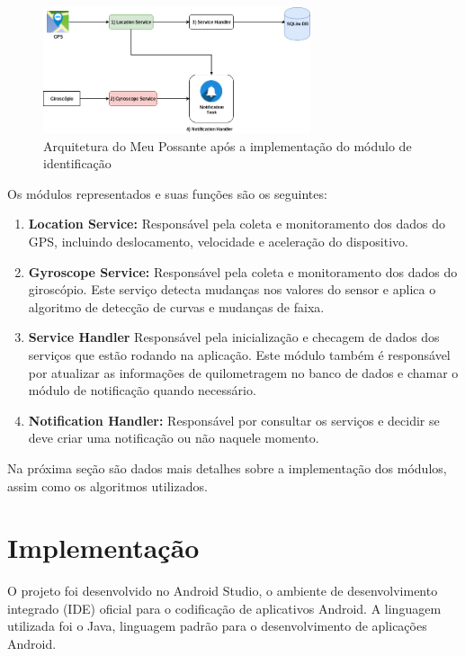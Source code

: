 \begin{figure}[h]
\centering
\includegraphics[width=0.7\textwidth]{images/arquitetura-meu-possante-com-modulo.png}
\caption{Arquitetura do Meu Possante após a implementação do módulo de identificação}
\label{arquitetura-meu-possante-com-modulo}
\end{figure}

Os módulos representados e suas funções são os seguintes:

\begin{enumerate}
  \item \textbf{Location Service:} Responsável pela coleta e monitoramento dos dados do GPS, incluindo deslocamento, velocidade e
  aceleração do dispositivo.
  \item \textbf{Gyroscope Service:} Responsável pela coleta e monitoramento dos dados do giroscópio. Este serviço detecta mudanças
  nos valores do sensor e aplica o algoritmo de detecção de curvas e mudanças de faixa.
  \item \textbf{Service Handler} Responsável pela inicialização e checagem de dados dos serviços
  que estão rodando na aplicação. Este módulo também é responsável por atualizar as informações
  de quilometragem no banco de dados e chamar o módulo de notificação quando necessário.
  \item \textbf{Notification Handler:} Responsável por consultar os serviços e decidir se deve criar uma notificação ou não naquele
  momento.
\end{enumerate}

Na próxima seção são dados mais detalhes sobre a implementação dos módulos, assim como os algoritmos utilizados.

\section{Implementação}
\label{sec-implementacao}

O projeto foi desenvolvido no Android Studio, o ambiente de desenvolvimento integrado (IDE) oficial para o
codificação de aplicativos Android. A linguagem utilizada foi o Java, linguagem padrão para o desenvolvimento
de aplicações Android.

